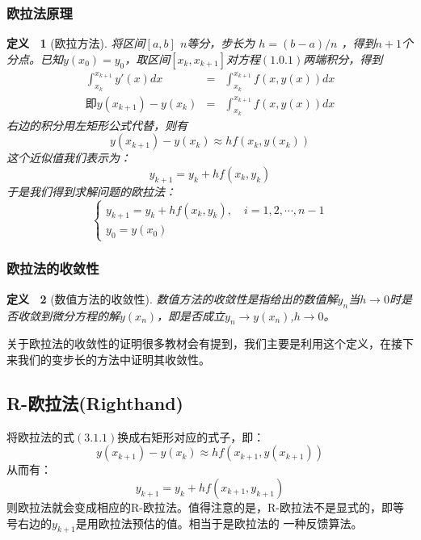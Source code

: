 \documentclass[a4paper,12pt]{article}
\newtheorem{defn}{定义~}
\begin{document}
\subsubsection{欧拉法原理}
\begin{defn}[欧拉方法]
    将区间$[a,b]$ $n$等分，步长为 $h=(b-a)/n$ ，得到$n+1$个分点。已知$y(x_0)=y_0$，取区间$[x_k,x_{k+1}]$对方程$(1.0.1)$两端积分，得到
\begin{eqnarray*}
    \int_{{x_k}}^{{x_{k + 1}}} {y'(x)dx}  &=& \int_{{x_k}}^{{x_{k + 1}}} {f(x,y(x))dx} \\
    \text{即}y({x_{k + 1}}) - y({x_k}) &=& \int_{{x_k}}^{{x_{k + 1}}} {f(x,y(x))dx}
\end{eqnarray*}
右边的积分用左矩形公式代替，则有
\begin{equation}
    y({x_{k + 1}}) - y({x_k}) \approx hf({x_k},y({x_k}))
\end{equation}
这个近似值我们表示为：
\begin{equation}
    {y_{k + 1}} = {y_k} + hf({x_k},{y_k})
\end{equation}
于是我们得到求解问题的欧拉法：
\begin{equation}
\left\{ \begin{array}{l}
{y_{k + 1}} = {y_k} + hf({x_k},{y_k}),\quad i = 1,2, \cdots ,n - 1\\
{y_0} = y({x_0})
\end{array} \right.
\end{equation}
\end{defn}

\subsubsection{欧拉法的收敛性}
\begin{defn}[数值方法的收敛性]
    数值方法的收敛性是指给出的数值解$y_n$当$h\rightarrow0$时是否收敛到微分方程的解$y(x_n)$，即是否成立$y_n \rightarrow y(x_n)$,$h\rightarrow0$。
\end{defn}

关于欧拉法的收敛性\cite{converge}的证明很多教材会有提到，我们主要是利用这个定义，在接下来我们的变步长的方法中证明其收敛性。

\subsection{R-欧拉法(Righthand)}
将欧拉法的式$(3.1.1)$换成右矩形对应的式子，即：
\begin{equation}
    y({x_{k + 1}}) - y({x_k}) \approx hf({x_{k+1}},y({x_{k+1}}))
\end{equation}
从而有：
\begin{equation}
    {y_{k + 1}} = {y_k} + hf({x_{k+1}},{y_{k+1}})
\end{equation}
则欧拉法就会变成相应的R-欧拉法。值得注意的是，R-欧拉法不是显式的，即等号右边的$y_{k+1}$是用欧拉法预估的值。相当于是欧拉法的
一种反馈算法。
\end{document}
